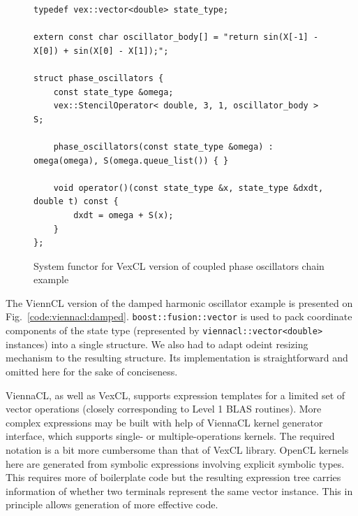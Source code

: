 \documentclass[1p]{elsarticle}
\newcommand{\code}[1]{\lstinline|#1|}
\newcommand{\figref}[1]{Fig.~\ref{#1}}
\begin{document}
\begin{figure}[p]
\begin{lstlisting}
typedef vex::vector<double> state_type;

extern const char oscillator_body[] = "return sin(X[-1] - X[0]) + sin(X[0] - X[1]);";

struct phase_oscillators {
    const state_type &omega;
    vex::StencilOperator< double, 3, 1, oscillator_body > S;

    phase_oscillators(const state_type &omega) : omega(omega), S(omega.queue_list()) { }

    void operator()(const state_type &x, state_type &dxdt, double t) const {
        dxdt = omega + S(x);
    }
};
\end{lstlisting}
\caption{System functor for VexCL version of coupled phase oscillators chain
example}
\label{code:vexcl:phase}
\end{figure}

The ViennCL version of the damped harmonic oscillator example is presented on
\figref{code:viennacl:damped}. \code{boost::fusion::vector} is used to pack
coordinate components of the state type (represented by
\code{viennacl::vector<double>} instances) into a single structure. We also had
to adapt odeint resizing mechanism to the resulting structure. Its
implementation is straightforward and omitted here for the sake of conciseness.

ViennaCL, as well as VexCL, supports expression templates for a limited set of
vector operations (closely corresponding to Level 1 BLAS routines). More
complex expressions may be built with help of ViennaCL kernel generator
interface, which supports single- or multiple-operations kernels. The required
notation is a bit more cumbersome than that of VexCL library. OpenCL kernels
here are generated from symbolic expressions involving explicit symbolic types.
This requires more of boilerplate code but the resulting expression tree
carries information of whether two terminals represent the same vector
instance. This in principle allows generation of more effective code.
\end{document}
